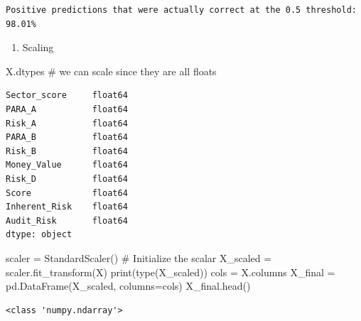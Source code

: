 \documentclass[
  11pt,
  letterpaper,
  DIV=11,
  numbers=noendperiod]{scrartcl}
\newenvironment{Shaded}{\begin{snugshade}}{\end{snugshade}}
\newcommand{\BuiltInTok}[1]{\textcolor[rgb]{0.00,0.23,0.31}{#1}}
\newcommand{\CommentTok}[1]{\textcolor[rgb]{0.37,0.37,0.37}{#1}}
\newcommand{\NormalTok}[1]{\textcolor[rgb]{0.00,0.23,0.31}{#1}}
\newcommand{\OperatorTok}[1]{\textcolor[rgb]{0.37,0.37,0.37}{#1}}
\providecommand{\tightlist}{%
  \setlength{\itemsep}{0pt}\setlength{\parskip}{0pt}}\usepackage{longtable,booktabs,array}
\begin{document}
\begin{verbatim}
Positive predictions that were actually correct at the 0.5 threshold: 98.01%
\end{verbatim}

\begin{enumerate}
\def\labelenumi{\arabic{enumi}.}
\setcounter{enumi}{5}
\tightlist
\item
  Scaling
\end{enumerate}

\begin{Shaded}
\begin{Highlighting}[]
\NormalTok{X.dtypes}
\CommentTok{\# we can scale since they are all floats}
\end{Highlighting}
\end{Shaded}

\begin{verbatim}
Sector_score     float64
PARA_A           float64
Risk_A           float64
PARA_B           float64
Risk_B           float64
Money_Value      float64
Risk_D           float64
Score            float64
Inherent_Risk    float64
Audit_Risk       float64
dtype: object
\end{verbatim}

\begin{Shaded}
\begin{Highlighting}[]
\NormalTok{scaler }\OperatorTok{=}\NormalTok{ StandardScaler()  }\CommentTok{\# Initialize the scalar}
\NormalTok{X\_scaled }\OperatorTok{=}\NormalTok{ scaler.fit\_transform(X)  }
\BuiltInTok{print}\NormalTok{(}\BuiltInTok{type}\NormalTok{(X\_scaled)) }
\NormalTok{cols }\OperatorTok{=}\NormalTok{ X.columns  }
\NormalTok{X\_final }\OperatorTok{=}\NormalTok{ pd.DataFrame(X\_scaled, columns}\OperatorTok{=}\NormalTok{cols) }
\NormalTok{X\_final.head()}
\end{Highlighting}
\end{Shaded}

\begin{verbatim}
<class 'numpy.ndarray'>
\end{verbatim}
\end{document}
